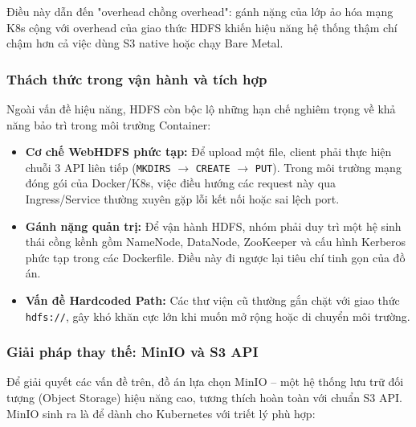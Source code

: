 Điều này dẫn đến "overhead chồng overhead": gánh nặng của lớp ảo hóa mạng K8s cộng với overhead của giao thức HDFS khiến hiệu năng hệ thống thậm chí chậm hơn cả việc dùng S3 native hoặc chạy Bare Metal.

\subsubsection{Thách thức trong vận hành và tích hợp}
Ngoài vấn đề hiệu năng, HDFS còn bộc lộ những hạn chế nghiêm trọng về khả năng bảo trì trong môi trường Container:

\begin{itemize}
    \item \textbf{Cơ chế WebHDFS phức tạp:} Để upload một file, client phải thực hiện chuỗi 3 API liên tiếp (\texttt{MKDIRS} $\rightarrow$ \texttt{CREATE} $\rightarrow$ \texttt{PUT}). Trong môi trường mạng đóng gói của Docker/K8s, việc điều hướng các request này qua Ingress/Service thường xuyên gặp lỗi kết nối hoặc sai lệch port.
    \item \textbf{Gánh nặng quản trị:} Để vận hành HDFS, nhóm phải duy trì một hệ sinh thái cồng kềnh gồm NameNode, DataNode, ZooKeeper và cấu hình Kerberos phức tạp trong các Dockerfile. Điều này đi ngược lại tiêu chí tinh gọn của đồ án.
    \item \textbf{Vấn đề Hardcoded Path:} Các thư viện cũ thường gắn chặt với giao thức \texttt{hdfs://}, gây khó khăn cực lớn khi muốn mở rộng hoặc di chuyển môi trường.
\end{itemize}

\subsubsection{Giải pháp thay thế: MinIO và S3 API}
Để giải quyết các vấn đề trên, đồ án lựa chọn MinIO – một hệ thống lưu trữ đối tượng (Object Storage) hiệu năng cao, tương thích hoàn toàn với chuẩn S3 API. MinIO sinh ra là để dành cho Kubernetes với triết lý phù hợp:

